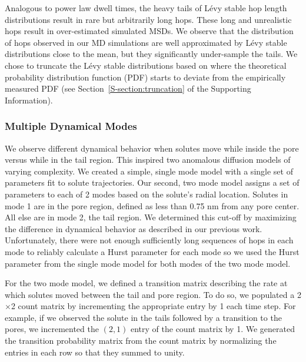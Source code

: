 \documentclass{article}
\begin{document}
  Analogous to power law dwell times, the heavy tails of L\'evy stable 
  hop length distributions result in rare but arbitrarily long hops. These long
  and unrealistic hops result in over-estimated simulated MSDs. We observe that
  the distribution of hops observed in our MD simulations are well approximated 
  by L\'evy stable distributions close to the mean, but they significantly under-sample
  the tails. We chose to truncate the L\'evy stable distributions based
  on where the theoretical probability distribution function (PDF) starts to 
  deviate from the empirically measured PDF (see Section~\ref{S-section:truncation}
  of the Supporting Information).
  
  
  \subsubsection*{Multiple Dynamical Modes}
  
  We observe different dynamical behavior when solutes move while inside 
  the pore versus while in the tail region. This inspired two anomalous diffusion 
  models of varying complexity. We created a simple, single mode model with a single 
  set of parameters fit to solute trajectories.
  Our second, two mode model assigns a set of parameters to each of 2 modes based
  on the solute's radial location. Solutes in mode 1 are in the pore region, defined
  as less than 0.75 nm from any pore center. All else are in mode 2, the tail region. 
  We determined this cut-off by maximizing the difference in dynamical behavior as 
  described in our previous work.~\cite{coscia_chemically_2019} Unfortunately, 
  there were not enough sufficiently long sequences of hops in each mode to reliably
  calculate a Hurst parameter for each mode so we used the Hurst parameter from the 
  single mode model for both modes of the two mode model.
  
  
  For the two mode model, we defined a transition matrix describing the rate at
  which solutes moved between the tail and pore region. To do so, we populated a
  2$\times$2 count matrix by incrementing the appropriate entry by 1 each time step. 
  For example, if we observed the solute in the tails followed by a transition to 
  the pores, we incremented the $(2, 1)$ entry of the count matrix by 1. We generated
  the transition probability matrix from the count matrix by normalizing the 
  entries in each row so that they summed to unity.
  
\end{document}
